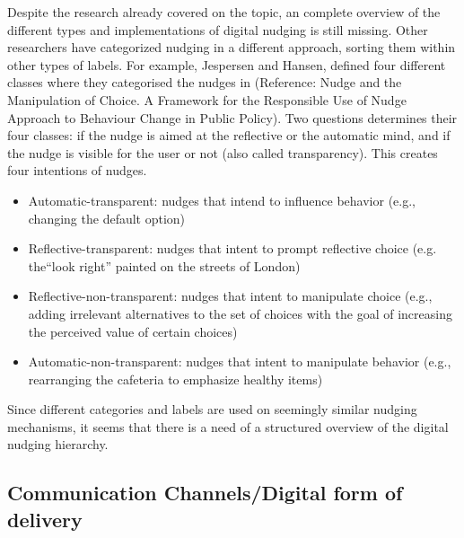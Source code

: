 {Despite the research already covered on the topic, an complete overview of the different types and implementations of digital nudging is still missing. Other researchers have categorized nudging in a different approach, sorting them within other types of labels. For example, Jespersen and Hansen, defined four different classes where they categorised the nudges in (Reference: Nudge and the Manipulation of Choice. A Framework for the Responsible Use of Nudge Approach to Behaviour Change in Public Policy). Two questions determines their four classes: if the nudge is aimed at the reflective or the automatic mind, and if the nudge is visible for the user or not (also called transparency). This creates four intentions of nudges. 
\begin{itemize}
\item Automatic-transparent: nudges that intend to influence behavior (e.g., changing the default option)
\item Reflective-transparent: nudges that intent to prompt reflective choice (e.g. the“look right” painted on the streets of London)
\item Reflective-non-transparent: nudges that intent to manipulate choice (e.g., adding irrelevant alternatives to the set of choices with the goal of increasing the perceived value of certain choices)
\item Automatic-non-transparent: nudges that intent to manipulate behavior (e.g., rearranging the cafeteria to emphasize healthy items)
\end{itemize}

Since different categories and labels are used on seemingly similar nudging mechanisms, it seems that there is a need of a structured overview of the digital nudging hierarchy. 


\subsection{Communication Channels/Digital form of delivery}


}
